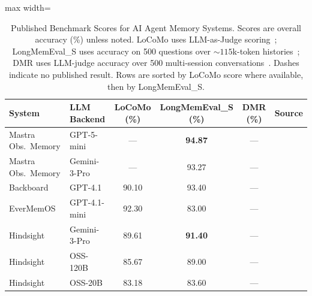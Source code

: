 

\begin{table}[!t]
\centering
\caption{Published Benchmark Scores for AI Agent Memory Systems.
Scores are overall accuracy (\%) unless noted.
LoCoMo uses LLM-as-Judge scoring~\cite{maharana2024locomo};
LongMemEval\_S uses accuracy on 500 questions over ${\sim}115$k-token histories~\cite{wu2025longmemeval};
DMR uses LLM-judge accuracy over 500 multi-session conversations~\cite{packer2023memgpt}.
Dashes indicate no published result.
Rows are sorted by LoCoMo score where available, then by LongMemEval\_S.}
\label{tab:benchmark-comparison}
\begin{adjustbox}{max width=\textwidth}
\begin{threeparttable}
\begin{tabular}{@{}llcccl@{}}
\toprule
\textbf{System} & \textbf{LLM Backend} & \textbf{LoCoMo (\%)} & \textbf{LongMemEval\_S (\%)} & \textbf{DMR (\%)} & \textbf{Source} \\
\midrule
Mastra Obs.\ Memory  & GPT-5-mini        & ---                  & \textbf{94.87}  & ---   & \cite{mastra2026om} \\
Mastra Obs.\ Memory  & Gemini-3-Pro      & ---                  & 93.27           & ---   & \cite{mastra2026om} \\
Backboard            & GPT-4.1\tnote{a}  & 90.10                & 93.40\tnote{b}  & ---   & \cite{backboard2025locomo,backboard2026longmemeval} \\
EverMemOS            & GPT-4.1-mini      & 92.30\tnote{c}       & 83.00           & ---   & \cite{evermemos2025} \\
Hindsight            & Gemini-3-Pro      & 89.61                & \textbf{91.40}  & ---   & \cite{latimer2025hindsight} \\
Hindsight            & OSS-120B          & 85.67                & 89.00           & ---   & \cite{latimer2025hindsight} \\
Hindsight            & OSS-20B           & 83.18                & 83.60           & ---   & \cite{latimer2025hindsight} \\

\end{tabular}
\end{threeparttable}
\end{adjustbox}
\end{table}

